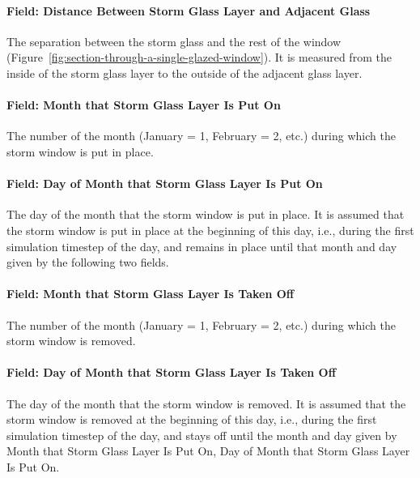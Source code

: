 \paragraph{Field: Distance Between Storm Glass Layer and Adjacent Glass}\label{field-distance-between-storm-glass-layer-and-adjacent-glass}

The separation between the storm glass and the rest of the window (Figure~\ref{fig:section-through-a-single-glazed-window}). It is measured from the inside of the storm glass layer to the outside of the adjacent glass layer.

\paragraph{Field: Month that Storm Glass Layer Is Put On}\label{field-month-that-storm-glass-layer-is-put-on}

The number of the month (January = 1, February = 2, etc.) during which the storm window is put in place.

\paragraph{Field: Day of Month that Storm Glass Layer Is Put On}\label{field-day-of-month-that-storm-glass-layer-is-put-on}

The day of the month that the storm window is put in place. It is assumed that the storm window is put in place at the beginning of this day, i.e., during the first simulation timestep of the day, and remains in place until that month and day given by the following two fields.

\paragraph{Field: Month that Storm Glass Layer Is Taken Off}\label{field-month-that-storm-glass-layer-is-taken-off}

The number of the month (January = 1, February = 2, etc.) during which the storm window is removed.

\paragraph{Field: Day of Month that Storm Glass Layer Is Taken Off}\label{field-day-of-month-that-storm-glass-layer-is-taken-off}

The day of the month that the storm window is removed. It is assumed that the storm window is removed at the beginning of this day, i.e., during the first simulation timestep of the day, and stays off until the month and day given by Month that Storm Glass Layer Is Put On, Day of Month that Storm Glass Layer Is Put On.

